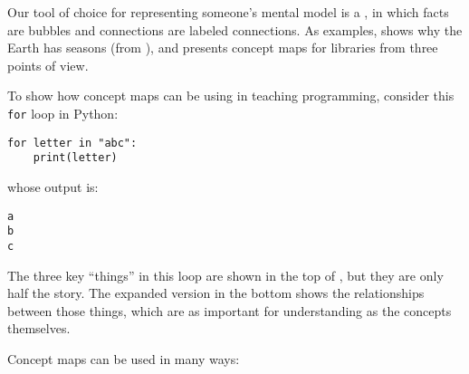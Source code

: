 
Our tool of choice for representing someone's mental model is a ,
in which facts are bubbles and connections are labeled connections.
As examples,
 shows why the Earth has seasons (from ),
and  presents concept maps for libraries from three points of view.


To show how concept maps can be using in teaching programming,
consider this \texttt{for} loop in Python:

\begin{verbatim}
for letter in "abc":
    print(letter)
\end{verbatim}

\noindent
whose output is:

\begin{verbatim}
a
b
c
\end{verbatim}

The three key ``things'' in this loop are shown in the top of ,
but they are only half the story.
The expanded version in the bottom shows the relationships between those things,
which are as important for understanding as the concepts themselves.


\newpage
Concept maps can be used in many ways:

